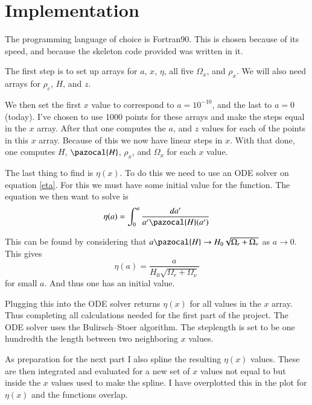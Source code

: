 \documentclass{aa}   %
\begin{document}
\section{Implementation}\label{sec:Imp}
The programming language of choice is Fortran90. This is chosen because of its speed, and because the skeleton code provided was written in it. 

The first step is to set up arrays for $a$, $x$, $\eta$, all five $\Omega_x$, and $\rho_x$. We will also need arrays for $\rho_c$, $H$, and $z$.

We then set the first $x$ value to correspond to $a= 10^{-10}$, and the last to $a=0$ (today). 
I've chosen to use 1000 points for these arrays and make the steps equal in the $x$ array. After that one computes the $a$, and $z$ values for each of the points in this $x$ array. Because of this we now have linear steps in $x$.
With that done, one computes $H$, $\pazocal{H}$, $\rho_x$, and $\Omega_x$ for each $x$ value.

The last thing to find is $\eta(x)$. 
To do this we need to use an ODE solver on equation \ref{eta}. For this we must have some initial value for the function. 
The equation we then want to solve is 
\begin{equation}
 \eta(a) = \int_0^a \frac{da'}{a'\pazocal{H}(a')}
\end{equation}

This can be found by considering that $a\pazocal{H} \rightarrow  H_0\sqrt{\Omega_r+\Omega_\nu}$ as $a \rightarrow 0$. This gives 
\begin{equation}
 \eta(a) = \frac{a}{H_0\sqrt{\Omega_r+\Omega_\nu}}
\end{equation}
for small $a$. And thus one has an initial value.

Plugging this into the ODE solver returns $\eta(x)$ for all values in the $x$ array. Thus completing all calculations needed for the first part of the project. The ODE solver uses the Bulirsch–Stoer algorithm. The steplength is set to be one hundredth the length between two neighboring $x$ values.

As preparation for the next part I also spline the resulting $\eta(x)$ values. These are then integrated and evaluated for a new set of $x$ values not equal to but inside the $x$ values used to make the spline. I have overplotted this in the plot for $\eta(x)$ and the functions overlap. 
\end{document}
